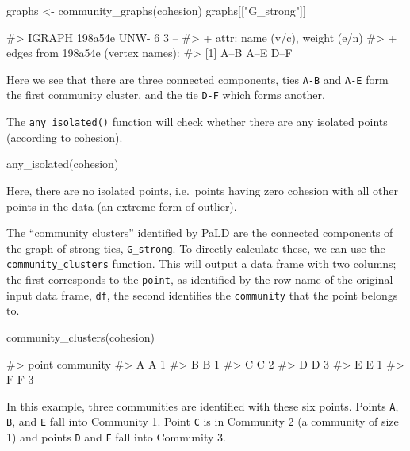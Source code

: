 \begin{Schunk}
\begin{Sinput}
graphs <- community_graphs(cohesion)
graphs[["G_strong"]]
\end{Sinput}
\begin{Soutput}
#> IGRAPH 198a54e UNW- 6 3 -- 
#> + attr: name (v/c), weight (e/n)
#> + edges from 198a54e (vertex names):
#> [1] A--B A--E D--F
\end{Soutput}
\end{Schunk}

Here we see that there are three connected components, ties \texttt{A-B}
and \texttt{A-E} form the first community cluster, and the tie
\texttt{D-F} which forms another.

The \texttt{any\_isolated()} function will check whether there are any
isolated points (according to cohesion).

\begin{Schunk}
\begin{Sinput}
any_isolated(cohesion)
\end{Sinput}
\end{Schunk}

\noindent Here, there are no isolated points, i.e.~points having zero
cohesion with all other points in the data (an extreme form of outlier).

The ``community clusters'' identified by PaLD are the connected
components of the graph of strong ties, \texttt{G\_strong}. To directly
calculate these, we can use the \texttt{community\_clusters} function.
This will output a data frame with two columns; the first corresponds to
the \texttt{point}, as identified by the row name of the original input
data frame, \texttt{df}, the second identifies the \texttt{community}
that the point belongs to.

\begin{Schunk}
\begin{Sinput}
community_clusters(cohesion)
\end{Sinput}
\begin{Soutput}
#>   point community
#> A     A         1
#> B     B         1
#> C     C         2
#> D     D         3
#> E     E         1
#> F     F         3
\end{Soutput}
\end{Schunk}

In this example, three communities are identified with these six points.
Points \texttt{A}, \texttt{B}, and \texttt{E} fall into Community 1.
Point \texttt{C} is in Community 2 (a community of size 1) and points
\texttt{D} and \texttt{F} fall into Community 3.

